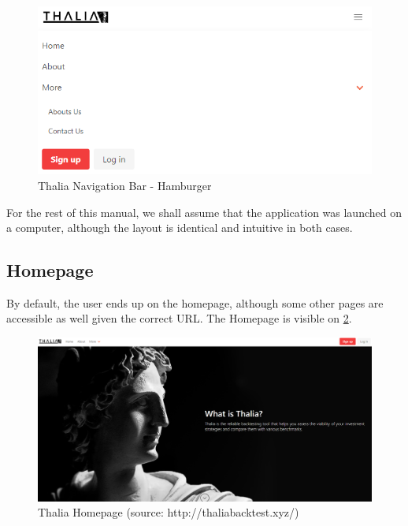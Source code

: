 \documentclass[main.tex]{subfiles}
\begin{document}
\begin{figure}[H]

   \centering

   \includegraphics[width=\textwidth]{08Appendices/081User/081Pictures/navbar_hamburger.png}

   \caption{Thalia Navigation Bar - Hamburger}

   \label{thalia_navbar_hamburger}

\end{figure}



For the rest of this manual, we shall assume that the application was launched on a computer, although the layout is identical and intuitive in both cases. 



\subsection{Homepage}



By default, the user ends up on the homepage, although some other pages are accessible as well given the correct URL. The Homepage is visible on \figurename{\ref{thalia_home}}.



\begin{figure}[H]

   \centering

   \includegraphics[width=\textwidth]{08Appendices/081User/081Pictures/homepage.png}

   \caption{Thalia Homepage (source: http://thaliabacktest.xyz/)}

   \label{thalia_home}

\end{figure}
\end{document}
